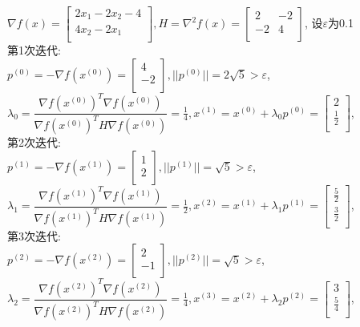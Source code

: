 \begin{solution}
    $\nabla f(x)=\begin{bmatrix}
        2x_1-2x_2-4  \\
        4x_2-2x_1  \\
    \end{bmatrix}, H=\nabla^2 f(x)=\begin{bmatrix}
        2   & -2  \\
        -2  & 4  \\
    \end{bmatrix}$,
    设$\varepsilon$为0.1\\
    第1次迭代:\\
    $p^{(0)}=-\nabla f(x^{(0)})=\begin{bmatrix} 4\\-2\\\end{bmatrix},||p^{(0)}||=2\sqrt{5}>\varepsilon$,\\
    $\lambda_0=\dfrac{\nabla f(x^{(0)})^T\nabla f(x^{(0)})}{\nabla f(x^{(0)})^TH\nabla f(x^{(0)})}=\frac{1}{4},x^{(1)}=x^{(0)}+\lambda_0p^{(0)}=\begin{bmatrix} 2\\\frac{1}{2}\\\end{bmatrix}$,\\
    第2次迭代:\\
    $p^{(1)}=-\nabla f(x^{(1)})=\begin{bmatrix} 1\\2\\\end{bmatrix},||p^{(1)}||=\sqrt{5}>\varepsilon$,\\
    $\lambda_1=\dfrac{\nabla f(x^{(1)})^T\nabla f(x^{(1)})}{\nabla f(x^{(1)})^TH\nabla f(x^{(1)})}=\frac{1}{2},x^{(2)}=x^{(1)}+\lambda_1p^{(1)}=\begin{bmatrix} \frac{5}{2}\\\frac{3}{2}\\\end{bmatrix}$,\\
    第3次迭代:\\
    $p^{(2)}=-\nabla f(x^{(2)})=\begin{bmatrix} 2\\-1\\\end{bmatrix},||p^{(2)}||=\sqrt{5}>\varepsilon$,\\
    $\lambda_2=\dfrac{\nabla f(x^{(2)})^T\nabla f(x^{(2)})}{\nabla f(x^{(2)})^TH\nabla f(x^{(2)})}=\frac{1}{4},x^{(3)}=x^{(2)}+\lambda_2p^{(2)}=\begin{bmatrix} 3\\\frac{5}{4}\\\end{bmatrix}$,\\

\end{solution}
